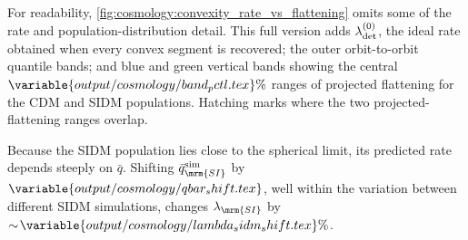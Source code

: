 \documentclass[linenumbers,twocolumn]{aastex701}
\newcommand{\lamSI}{\ensuremath{\lambda_{\mrm{SI}}}}  %
\newcommand{\lamdadet}[1]{\ensuremath{\lambda_{\rm det}^{({#1})}}}
\begin{document}
    For readability, \autoref{fig:cosmology:convexity_rate_vs_flattening} omits some of the rate and population-distribution detail. %
    This full version adds $\lamdadet{0}$, the ideal rate obtained when every convex segment is recovered; the outer orbit-to-orbit quantile bands; and blue and green vertical bands showing the central $\variable{output/cosmology/band_pctl.tex}\%$ ranges of projected flattening for the \gls{CDM} and \gls{SIDM} populations. %
    Hatching marks where the two projected-flattening ranges overlap. %

    Because the \gls{SIDM} population lies close to the spherical limit, its predicted rate depends steeply on $\bar{q}$. %
    Shifting $\bar{q}_{\mrm{SI}}^{\rm sim}$ by $\variable{output/cosmology/qbar_shift.tex}$, well within the variation between different \gls{SIDM} simulations, changes $\lamSI$ by $\sim\!\variable{output/cosmology/lambda_sidm_shift.tex}\%$. %




\end{document}
